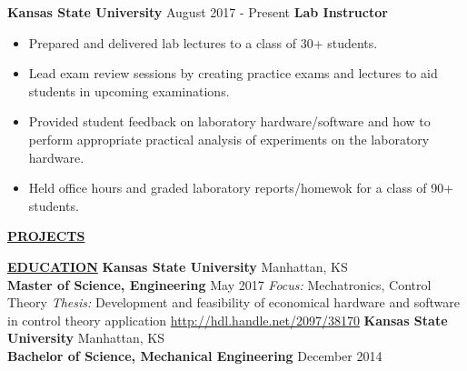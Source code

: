 \documentclass[8pt,letterpaper,oneside]{article}
\newcommand{\longunderline}[1]{\uline{#1\hfill\mbox{}}}
\newcommand{\sectionhead}[1]{ \large \flushleft \longunderline{\textbf{#1}}} %
\begin{document}
    \normalsize{\textbf{Kansas State University}}
    \hfill
    August 2017 - Present
    \newline
    \normalsize{\textbf{Lab Instructor}}
    \begin{sectionitems}
        \begin{itemize}
            \setlength\itemsep{0.1em}
            \setlength{\itemindent}{-0.4em}
            \item Prepared and delivered lab lectures to a class of 30+ students.
            \item Lead exam review sessions by creating practice exams and lectures to aid students in upcoming examinations.
            \item Provided student feedback on laboratory hardware/software and how to perform appropriate practical analysis of experiments on the laboratory hardware.
            \item Held office hours and graded laboratory reports/homewok for a class of 90+ students.
        \end{itemize}
    \end{sectionitems}


    \sectionhead{PROJECTS}

    \sectionhead{EDUCATION}
        \newline
        \small{\textbf{Kansas State University}}
        \hfill
        Manhattan, KS\\
        \small{\textbf{Master of Science, Engineering}}
        \hfill
        May 2017
        \newline
        \textit{Focus:} Mechatronics, Control Theory
        \newline
        \textit{Thesis:} Development and feasibility of economical hardware and software in control theory application
        \newline
        \href{http://hdl.handle.net/2097/38170}{http://hdl.handle.net/2097/38170}
        \newline
        \newline
        \small{\textbf{Kansas State University}}
        \hfill
        Manhattan, KS\\
        \small{\textbf{Bachelor of Science, Mechanical Engineering}}
        \hfill
        December 2014
\end{document}
